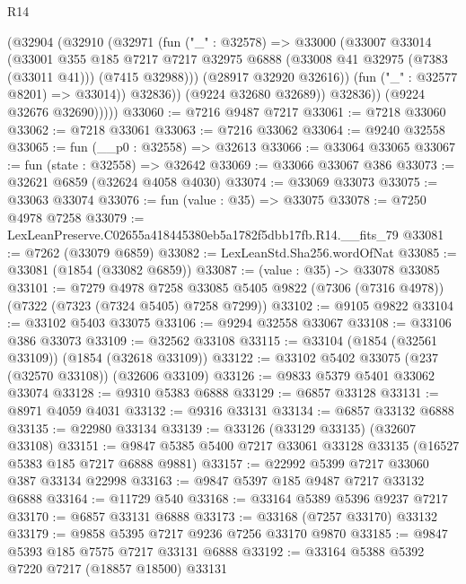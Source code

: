 \begin{lexlean}{R14}
\begin{coremodule}
                  (@32904
                    (@32910
                      (@32971
                        (fun ("_" : @32578) =>
                        @33000
                          (@33007
                            @33014
                            (@33001
                              @355
                              @185
                              @7217
                              @7217
                              @32975
                              @6888
                              (@33008 @41 @32975 (@7383 (@33011 @41)))
                              (@7415 @32988)))
                          (@28917 @32920 @32616))
                        (fun ("_" : @32577 @8201) => @33014))
                      @32836))
                  (@9224 @32680 @32689))
                @32836))
            (@9224 @32676 @32690)))))
@33060 := @7216 @9487 @7217
@33061 := @7218 @33060
@33062 := @7218 @33061
@33063 := @7216 @33062
@33064 := @9240 @32558
@33065 := fun (__p0 : @32558) => @32613
@33066 := @33064 @33065
@33067 := fun (state : @32558) => @32642
@33069 := @33066 @33067 @386
@33073 := @32621 @6859 (@32624 @4058 @4030)
@33074 := @33069 @33073
@33075 := @33063 @33074
@33076 := fun (value : @35) => @33075
@33078 := @7250 @4978 @7258
@33079 := LexLeanPreserve.C02655a418445380eb5a1782f5dbb17fb.R14.__fits_79
@33081 := @7262 (@33079 @6859)
@33082 := LexLeanStd.Sha256.wordOfNat
@33085 := @33081 (@1854 (@33082 @6859))
@33087 := (value : @35) -> @33078 @33085
@33101 := @7279
    @4978
    @7258
    @33085
    @5405
    @9822
    (@7306 (@7316 @4978))
    (@7322 (@7323 (@7324 @5405) @7258 @7299))
@33102 := @9105 @9822
@33104 := @33102 @5403 @33075
@33106 := @9294 @32558 @33067
@33108 := @33106 @386 @33073
@33109 := @32562 @33108
@33115 := @33104 (@1854 (@32561 @33109)) (@1854 (@32618 @33109))
@33122 := @33102 @5402 @33075 (@237 (@32570 @33108)) (@32606 @33109)
@33126 := @9833 @5379 @5401 @33062 @33074
@33128 := @9310 @5383 @6888
@33129 := @6857 @33128
@33131 := @8971 @4059 @4031
@33132 := @9316 @33131
@33134 := @6857 @33132 @6888
@33135 := @22980 @33134
@33139 := @33126 (@33129 @33135) (@32607 @33108)
@33151 := @9847 @5385 @5400 @7217 @33061 @33128 @33135 (@16527 @5383 @185 @7217 @6888 @9881)
@33157 := @22992 @5399 @7217 @33060 @387 @33134 @22998
@33163 := @9847 @5397 @185 @9487 @7217 @33132 @6888
@33164 := @11729 @540
@33168 := @33164 @5389 @5396 @9237 @7217
@33170 := @6857 @33131 @6888
@33173 := @33168 (@7257 @33170) @33132
@33179 := @9858 @5395 @7217 @9236 @7256 @33170 @9870
@33185 := @9847 @5393 @185 @7575 @7217 @33131 @6888
@33192 := @33164 @5388 @5392 @7220 @7217 (@18857 @18500) @33131

\end{coremodule}
\end{lexlean}
